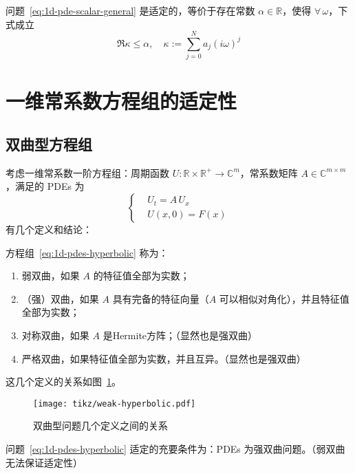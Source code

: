 \begin{theorem}
    问题~\eqref{eq:1d-pde-scalar-general} 是适定的，等价于存在常数 $\alpha \in \mathbb{R}$，使得 $\forall\,\omega $，下式成立
    \[
        \Re \kappa \le \alpha,
        \quad \kappa := \sum_{j=0}^N a_j (i \omega)^j
    \]
\end{theorem}


\section{一维常系数方程组的适定性}

\subsection{双曲型方程组}

考虑一维常系数一阶方程组：周期函数 $U: \mathbb{R} \times \mathbb{R}^+ \to \mathbb{C}^{m}$，常系数矩阵 $A \in \mathbb{C}^{m \times m}$，满足的 PDEs 为
\begin{equation}
    \left\{
    \begin{aligned}
         & U_t = A\,U_x  \\
         & U(x,0) = F(x)
    \end{aligned}
    \right.
    \label{eq:1d-pdes-hyperbolic}
\end{equation}
有几个定义和结论：
\begin{definition}
    方程组~\eqref{eq:1d-pdes-hyperbolic} 称为：
    \begin{enumerate}
        \item 弱双曲，如果 $A$ 的特征值全部为实数；
        \item （强）双曲，如果 $A$ 具有完备的特征向量（$A$ 可以相似对角化），并且特征值全部为实数；
        \item 对称双曲，如果 $A$ 是Hermite方阵；（显然也是强双曲）
        \item 严格双曲，如果特征值全部为实数，并且互异。（显然也是强双曲）
    \end{enumerate}
\end{definition}

这几个定义的关系如图~\ref{fig:weak-hyperbolic}。

\begin{figure}[htbp]
    \centering
    \texttt{[image: tikz/weak-hyperbolic.pdf]}
    \caption{双曲型问题几个定义之间的关系} \label{fig:weak-hyperbolic}
\end{figure}


\begin{theorem}\label{thm:well-posed-2}
    问题~\eqref{eq:1d-pdes-hyperbolic} 适定的充要条件为：PDEs 为强双曲问题。（弱双曲无法保证适定性）
\end{theorem}

